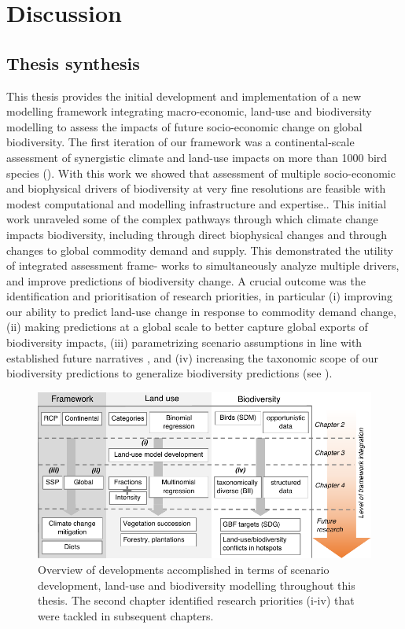\chapter{Discussion}\label{ch5}
\newpage

\section{Thesis synthesis}
This thesis provides the initial development and implementation of a new modelling framework integrating macro-economic, land-use and biodiversity modelling to assess the impacts of future socio-economic change on global biodiversity.
The first iteration of our framework was a continental-scale assessment of synergistic climate and land-use impacts on more than 1000 bird species (). With this work we showed that assessment of multiple socio-economic and biophysical drivers of biodiversity at very fine resolutions are feasible with modest computational and modelling infrastructure and expertise.. This initial work unraveled some of the complex pathways through which climate change impacts biodiversity, including through direct biophysical changes and through changes to global commodity demand and supply. This demonstrated the utility of integrated assessment frame- works to simultaneously analyze multiple drivers, and improve predictions of biodiversity change. A crucial outcome was the identification and prioritisation of research priorities, in particular (i) improving our ability to predict land-use change in response to commodity demand change, (ii) making predictions at a global scale to better capture global exports of biodiversity impacts, (iii) parametrizing scenario assumptions in line with established future narratives \citep[the so-called ‘shared socio-economic pathways’][]{oneill_new_2014}, and (iv) increasing the taxonomic scope of our biodiversity predictions to generalize biodiversity predictions (see ).


\begin{figure}[htb]
\centering
\includegraphics{chapters/figures/chapter5/fig1.pdf} 
\caption{Overview of developments accomplished in terms of scenario development, land-use and biodiversity modelling throughout this thesis. The second chapter identified research priorities (i-iv) that were tackled in subsequent chapters.}
\label{ch5:fig1}
\end{figure}

